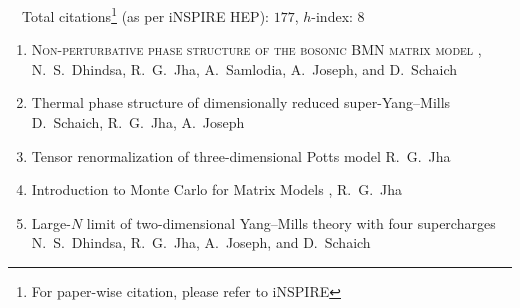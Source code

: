  {\faLeanpub}
~~Total citations\footnote{For paper-wise citation, please refer to iNSPIRE} (as per iNSPIRE HEP): $177$, $h$-index: $8$
\begin{enumerate}
\item \textsc{Non-perturbative phase structure of the bosonic BMN matrix model}  \newline 
\hfill  {},    \newline 	
N.~S.~Dhindsa, R.~G.~Jha, A.~Samlodia, A.~Joseph, and D.~Schaich
\vspace{1mm} 
\item Thermal phase structure of dimensionally reduced super-Yang--Mills \newline 
{} \newline 
D.~Schaich, R.~G.~Jha, A.~Joseph
\vspace{1mm} 
\item Tensor renormalization of three-dimensional Potts model  \newline 
{} \newline 
R.~G.~Jha
\vspace{1mm} 
 \item Introduction to Monte Carlo for Matrix Models \newline 
{},  \newline  
 R.~G.~Jha
 \vspace{1mm} 
 \item Large-$N$ limit of two-dimensional Yang--Mills theory with four supercharges \newline 
{} \newline 
 N.~S.~Dhindsa, R.~G.~Jha, A.~Joseph, and D.~Schaich
 \vspace{1mm}  

\end{enumerate}
